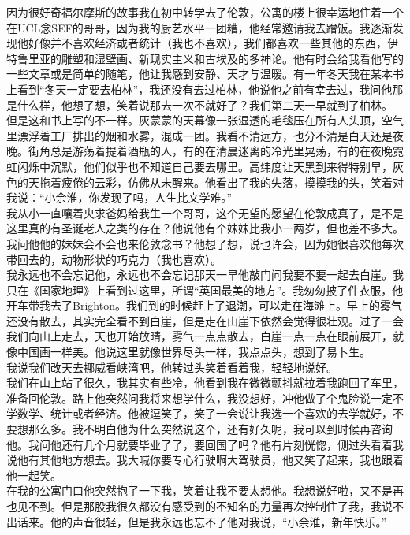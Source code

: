 \documentclass[letterpaper, 12pt]{article}
\begin{document}
\begin{multicols}{2}
因为很好奇福尔摩斯的故事我在初中转学去了伦敦，公寓的楼上很幸运地住着一个在UCL念SEF的哥哥，因为我的厨艺水平一团糟，他经常邀请我去蹭饭。我逐渐发现他好像并不喜欢经济或者统计（我也不喜欢），我们都喜欢一些其他的东西，伊特鲁里亚的雕塑和湿壁画、新现实主义和古埃及的多神论。他有时会给我看他写的一些文章或是简单的随笔，他让我感到安静、天才与温暖。有一年冬天我在某本书上看到“冬天一定要去柏林”，我还没有去过柏林，他说他之前有幸去过，我问他那是什么样，他想了想，笑着说那去一次不就好了？我们第二天一早就到了柏林。\\

但是这和书上写的不一样。灰蒙蒙的天幕像一张湿透的毛毯压在所有人头顶，空气里漂浮着工厂排出的烟和水雾，混成一团。我看不清远方，也分不清是白天还是夜晚。街角总是游荡着提着酒瓶的人，有的在清晨迷离的冷光里晃荡，有的在夜晚霓虹闪烁中沉默，他们似乎也不知道自己要去哪里。高纬度让天黑到来得特别早，灰色的天拖着疲倦的云彩，仿佛从未醒来。他看出了我的失落，摸摸我的头，笑着对我说：“小余淮，你发现了吗，人生比文学难。”\\

我从小一直嚷着央求爸妈给我生一个哥哥，这个无望的愿望在伦敦成真了，是不是这里真的有圣诞老人之类的存在？他说他有个妹妹比我小一两岁，但也差不多大。我问他他的妹妹会不会也来伦敦念书？他想了想，说也许会，因为她很喜欢他每次带回去的，动物形状的巧克力（我也喜欢）。\\

我永远也不会忘记他，永远也不会忘记那天一早他敲门问我要不要一起去白崖。我只在《国家地理》上看到过这里，所谓“英国最美的地方”。我匆匆披了件衣服，他开车带我去了Brighton。我们到的时候赶上了退潮，可以走在海滩上。早上的雾气还没有散去，其实完全看不到白崖，但是走在山崖下依然会觉得很壮观。过了一会我们向山上走去，天也开始放晴，雾气一点点散去，白崖一点一点在眼前展开，就像中国画一样美。他说这里就像世界尽头一样，我点点头，想到了易卜生。\\

我说我们改天去挪威看峡湾吧，他转过头笑着看着我，轻轻地说好。\\

我们在山上站了很久，我其实有些冷，他看到我在微微颤抖就拉着我跑回了车里，准备回伦敦。路上他突然问我将来想学什么，我没想好，冲他做了个鬼脸说一定不学数学、统计或者经济。他被逗笑了，笑了一会说让我选一个喜欢的去学就好，不要想那么多。我不明白他为什么突然说这个，还有好久呢，我可以到时候再咨询他。我问他还有几个月就要毕业了了，要回国了吗？他有片刻恍惚，侧过头看着我说他有其他地方想去。我大喊你要专心行驶啊大驾驶员，他又笑了起来，我也跟着他一起笑。\\

在我的公寓门口他突然抱了一下我，笑着让我不要太想他。我想说好啦，又不是再也见不到。但是那股我很久都没有感受到的不知名的力量再次控制住了我，我说不出话来。他的声音很轻，但是我永远也忘不了他对我说，“小余淮，新年快乐。”\\


\end{multicols}
\end{document}
